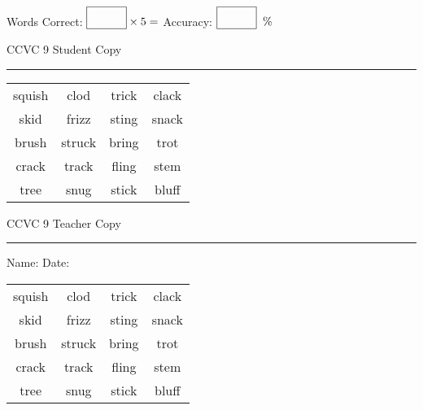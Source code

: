 \documentclass{memoir}
\begin{document}
\small

Words Correct: $\fbox{\phantom{\huge 100}} \times 5 = $ Accuracy: $\fbox{\phantom{\huge 100}}\;\; \%$ 

\vfill

\newpage


\footnotesize \noindent
CCVC 9 \hfill Student Copy
\smallskip
\hrule

\Large

\setlength{\tabcolsep}{14pt}
\def\arraystretch{3}

{\selectfont


\begin{vplace}[0.5]
\begin{center}
\begin{tabular}{cccc}
squish & clod & trick & clack             \\
skid & frizz & sting & snack \\
brush & struck & bring      & trot \\
crack       & track       & fling & stem \\
tree & snug & stick & bluff \\
\end{tabular}
\end{center}
\end{vplace}

}

\newpage

\footnotesize \noindent
CCVC 9 \hfill Teacher Copy
\smallskip
\hrule

\small

\vfill

\noindent
Name: \underline{\hspace{1.75in}} \hfill Date: \underline{\hspace{1in}}

\Large

{\selectfont


\begin{vplace}[0.5]
\begin{center}
\begin{tabular}{cccc}
squish & clod & trick & clack             \\
skid & frizz & sting & snack \\
brush & struck & bring      & trot \\
crack       & track       & fling & stem \\
tree & snug & stick & bluff \\
\end{tabular}
\end{center}
\end{vplace}



}
\end{document}
